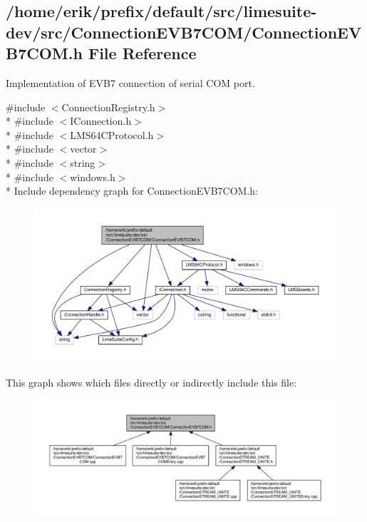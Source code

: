 \subsection{/home/erik/prefix/default/src/limesuite-\/dev/src/\+Connection\+E\+V\+B7\+C\+O\+M/\+Connection\+E\+V\+B7\+C\+OM.h File Reference}
\label{ConnectionEVB7COM_8h}


Implementation of E\+V\+B7 connection of serial C\+OM port.  


{\ttfamily \#include $<$Connection\+Registry.\+h$>$}\\*
{\ttfamily \#include $<$I\+Connection.\+h$>$}\\*
{\ttfamily \#include $<$L\+M\+S64\+C\+Protocol.\+h$>$}\\*
{\ttfamily \#include $<$vector$>$}\\*
{\ttfamily \#include $<$string$>$}\\*
{\ttfamily \#include $<$windows.\+h$>$}\\*
Include dependency graph for Connection\+E\+V\+B7\+C\+O\+M.\+h\+:
\nopagebreak
\begin{figure}[H]
\begin{center}
\leavevmode
\includegraphics[width=350pt]{df/d97/ConnectionEVB7COM_8h__incl}
\end{center}
\end{figure}
This graph shows which files directly or indirectly include this file\+:
\nopagebreak
\begin{figure}[H]
\begin{center}
\leavevmode
\includegraphics[width=350pt]{db/dfc/ConnectionEVB7COM_8h__dep__incl}
\end{center}
\end{figure}
